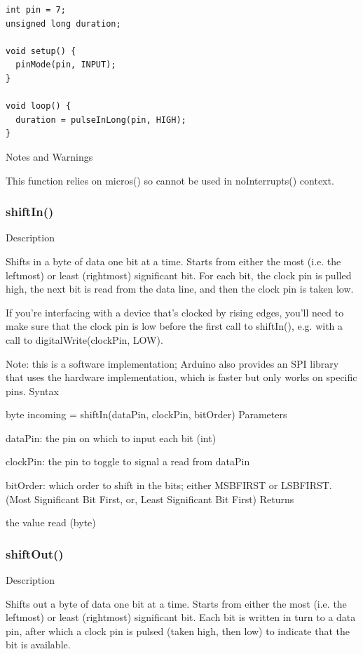 \documentclass[12pt,a4paper]{report}  %
\begin{document}
\begin{lstlisting}[label=digitalwrite,caption=pulseInLong]
int pin = 7;
unsigned long duration;

void setup() {
  pinMode(pin, INPUT);
}

void loop() {
  duration = pulseInLong(pin, HIGH);
}
\end{lstlisting}

Notes and Warnings

This function relies on micros() so cannot be used in noInterrupts() context.

\subsubsection{shiftIn()}\label{shiftIn}


Description

Shifts in a byte of data one bit at a time. Starts from either the most (i.e. the leftmost) or least (rightmost) significant bit. For each bit, the clock pin is pulled high, the next bit is read from the data line, and then the clock pin is taken low.

If you’re interfacing with a device that’s clocked by rising edges, you’ll need to make sure that the clock pin is low before the first call to shiftIn(), e.g. with a call to digitalWrite(clockPin, LOW).

Note: this is a software implementation; Arduino also provides an SPI library that uses the hardware implementation, which is faster but only works on specific pins.
Syntax

byte incoming = shiftIn(dataPin, clockPin, bitOrder)
Parameters

dataPin: the pin on which to input each bit (int)

clockPin: the pin to toggle to signal a read from dataPin

bitOrder: which order to shift in the bits; either MSBFIRST or LSBFIRST. (Most Significant Bit First, or, Least Significant Bit First)
Returns

the value read (byte)


\subsubsection{shiftOut()}\label{shiftOut}


Description

Shifts out a byte of data one bit at a time. Starts from either the most (i.e. the leftmost) or least (rightmost) significant bit. Each bit is written in turn to a data pin, after which a clock pin is pulsed (taken high, then low) to indicate that the bit is available.
\end{document}
